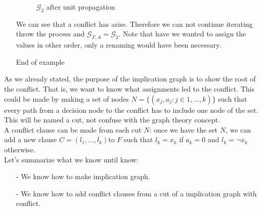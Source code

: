 \begin{itemize}
\begin{figure}[H]
  \centering
  \caption{$\mathcal{G}_2$ after unit propagation}
\end{figure}

We can see that a conflict has arise. Therefore we can not continue iterating throw the process and $\mathcal{G}_{F,A} = \mathcal{G}_2$. Note that have we wanted to assign the values in other order, only a renaming would have been necessary. 
\item[End of example]
\end{itemize}
As we already stated, the purpose of the implication graph is to show the root of the conflict. That is, we want to know what assignments led to the conflict. This could be made by making a set of nodes $N=\{(x_j,a_j: j\in 1,...,k)\}$ such that every path from a decision node to the conflict has to include one node of the set. This will be named a cut, not confuse with the graph theory concept.\\


A conflict clause can be made from each cut $N$: once we have the set $N$, we can add a new clause $C = (l_1,...,l_k)$to $F$ such that $l_k = x_k$ if $a_k = 0$ and $l_k=\neg x_k$ otherwise.\\

Let's summarize what we know until know:
\begin{itemize}
\item[-] We know how to make implication graph.
\item[-] We know how to add conflict clauses from a cut of a implication graph with conflict.  
\end{itemize}


